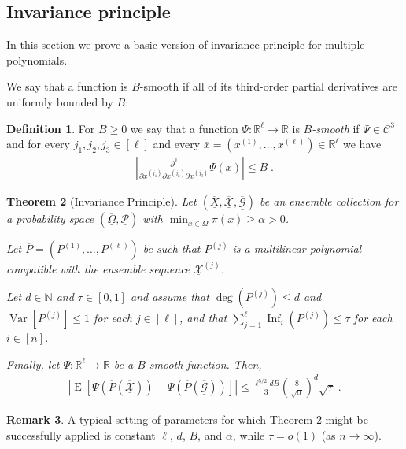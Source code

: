 \documentclass{daj}
\newcommand{\1}{\mathbbm{1}}
\theoremstyle{plain}
\newtheorem{theorem}{Theorem}[section]
\theoremstyle{definition}
\newtheorem{definition}[theorem]{Definition}
\newtheorem{remark}[theorem]{Remark}
\DeclareMathOperator*{\EE}{E}
\DeclareMathOperator*{\Var}{Var}
\DeclareMathOperator{\Inf}{Inf}
\begin{document}
\subsection{Invariance principle}

In this section we prove a basic version of invariance principle for multiple
polynomials.

We say that a function is $B$-smooth if all of its third-order partial
derivatives are uniformly bounded by $B$:
\begin{definition}
For $B \ge 0$ we say that a function $\Psi: \mathbb{R}^\ell \to \mathbb{R}$ is
\emph{$B$-smooth} if $\Psi \in \mathcal{C}^3$ and
for every $j_1, j_2, j_3 \in [\ell]$ and every 
$\overline{x} = (x^{(1)}, \ldots, x^{(\ell)}) \in \mathbb{R}^\ell$ we have
\begin{align*}
  \left| \frac{\partial^3}
  {\partial x^{(j_1)} \partial x^{(j_2)} \partial x^{(j_3)}} 
  \Psi(\overline{x}) \right| \le B \; .
\end{align*}
\end{definition}

\begin{theorem}[Invariance Principle]
\label{thm:invariance-main}
Let $(\overline{\underline{X}}, 
\overline{\underline{\mathcal{X}}},
\overline{\underline{\mathcal{G}}})$ be an ensemble collection
for a probability space 
$(\overline{\underline{\Omega}}, \underline{\mathcal{P}})$
with $\min_{x \in \Omega} \pi(x) \ge \alpha > 0$.

Let $\overline{P} = (P^{(1)}, \ldots, P^{(\ell)})$ be
such that $P^{(j)}$ is a multilinear polynomial compatible with 
the ensemble sequence $\underline{\mathcal{X}}^{(j)}$.

Let $d \in \mathbb{N}$ and $\tau \in [0, 1]$ and assume that
$\deg(P^{(j)}) \le d$ and $\Var[P^{(j)}] \le 1$ for each $j \in [\ell]$, 
and that $\sum_{j=1}^\ell \Inf_i(P^{(j)}) \le \tau$ for each $i \in [n]$.

Finally, let $\Psi: \mathbb{R}^\ell \to \mathbb{R}$
be a $B$-smooth function. Then,
\begin{align*}
\left| \EE \left[
  \Psi(\overline{P}(\overline{\underline{\mathcal{X}}}))
  - \Psi(\overline{P}(\overline{\underline{\mathcal{G}}}))
  \right] \right|
  \le
  \frac{\ell^{5/2}d B}{3} \left( \frac{8}{\sqrt{\alpha}} \right)^d 
  \sqrt{\tau} \; .
\end{align*}
\end{theorem}

\begin{remark}
A typical setting of parameters for which Theorem \ref{thm:invariance-main}
might be successfully applied is constant $\ell$, $d$, $B$, and $\alpha$,
while $\tau = o(1)$ (as $n \to \infty$).
\end{remark}
\end{document}
